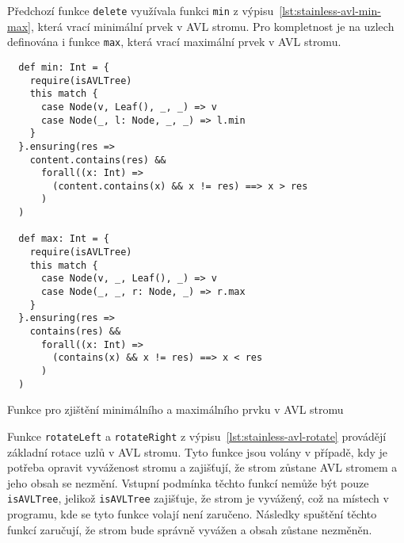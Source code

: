 Předchozí funkce \texttt{delete} využívala funkci \texttt{min} z výpisu~\ref{lst:stainless-avl-min-max},
která vrací minimální prvek v AVL stromu.
Pro kompletnost je na uzlech definována i funkce \texttt{max},
která vrací maximální prvek v AVL stromu.

\begin{listing}[H]
  \begin{verbatim}
  def min: Int = {
    require(isAVLTree)
    this match {
      case Node(v, Leaf(), _, _) => v
      case Node(_, l: Node, _, _) => l.min
    }
  }.ensuring(res =>
    content.contains(res) &&
      forall((x: Int) =>
        (content.contains(x) && x != res) ==> x > res
      )
  )

  def max: Int = {
    require(isAVLTree)
    this match {
      case Node(v, _, Leaf(), _) => v
      case Node(_, _, r: Node, _) => r.max
    }
  }.ensuring(res =>
    contains(res) &&
      forall((x: Int) =>
        (contains(x) && x != res) ==> x < res
      )
  )
  \end{verbatim}
  \caption{Funkce pro zjištění minimálního a maximálního prvku v AVL stromu}
  \label{lst:stainless-avl-min-max}
\end{listing}

Funkce \texttt{rotateLeft} a \texttt{rotateRight}
z výpisu~\ref{lst:stainless-avl-rotate}
provádějí základní rotace uzlů v AVL stromu.
Tyto funkce jsou volány v případě, kdy je potřeba opravit vyváženost stromu
a zajišťují, že strom zůstane AVL stromem a jeho obsah se nezmění.
Vstupní podmínka těchto funkcí nemůže být pouze \texttt{isAVLTree},
jelikož \texttt{isAVLTree} zajišťuje, že strom je vyvážený,
což na místech v programu, kde se tyto funkce volají není zaručeno.
Následky spuštění těchto funkcí zaručují,
že strom bude správně vyvážen a obsah zůstane nezměněn.

